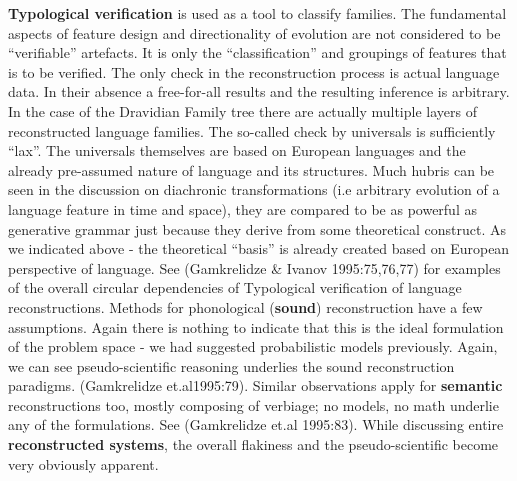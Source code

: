 \textbf{Typological verification} is used as a tool to classify families. The fundamental aspects of feature design and directionality of evolution are not considered to be “verifiable” artefacts. It is only the “classification” and groupings of features that is to be verified. The only check in the reconstruction process is actual language data. In their absence a free-for-all results and the resulting inference is arbitrary. In the case of the Dravidian Family tree there are actually multiple layers of reconstructed language families. The so-called check by universals is sufficiently “lax”. The universals themselves are based on European languages and the already pre-assumed nature of language and its structures. Much hubris can be seen in the discussion on diachronic transformations (i.e arbitrary evolution of a language feature in time and space), they are compared to be as powerful as generative grammar just because they derive from some theoretical construct. As we indicated above - the theoretical “basis” is already created based on European perspective of language. See (Gamkrelidze \& Ivanov 1995:75,76,77) for examples of the overall circular dependencies of Typological verification of language reconstructions. Methods for phonological (\textbf{sound}) reconstruction have a few assumptions. Again there is nothing to indicate that this is the ideal formulation of the problem space - we had suggested probabilistic models previously. Again, we can see pseudo-scientific reasoning underlies the sound reconstruction paradigms. (Gamkrelidze et.al1995:79). Similar observations apply for \textbf{semantic} reconstructions too, mostly composing of verbiage; no models, no math underlie any of the formulations. See (Gamkrelidze et.al 1995:83). While discussing entire \textbf{reconstructed systems}, the overall flakiness and the pseudo-scientific become very obviously apparent.


